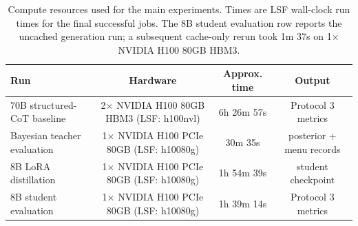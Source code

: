 \begin{table}[t]
\centering
\small
\begin{tabular}{lccc}
\toprule
Run & Hardware & Approx. time & Output \\
\midrule
70B structured-CoT baseline & 2$\times$ NVIDIA H100 80GB HBM3 (LSF: h100nvl) & 6h 26m 57s & Protocol 3 metrics \\
Bayesian teacher evaluation & 1$\times$ NVIDIA H100 PCIe 80GB (LSF: h10080g) & 30m 35s & posterior + menu records \\
8B LoRA distillation & 1$\times$ NVIDIA H100 PCIe 80GB (LSF: h10080g) & 1h 54m 39s & student checkpoint \\
8B student evaluation & 1$\times$ NVIDIA H100 PCIe 80GB (LSF: h10080g) & 1h 39m 14s & Protocol 3 metrics \\
\bottomrule
\end{tabular}
\caption{Compute resources used for the main experiments. Times are LSF wall-clock run times for the final successful jobs. The 8B student evaluation row reports the uncached generation run; a subsequent cache-only rerun took 1m 37s on 1$\times$ NVIDIA H100 80GB HBM3.}
\label{tab:compute}
\end{table}
